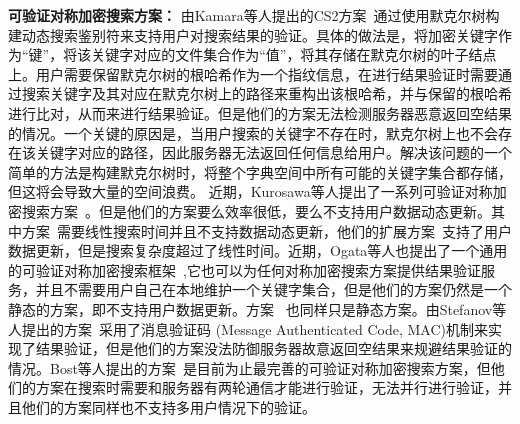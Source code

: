 



\noindent\textbf{可验证对称加密搜索方案：} 由Kamara等人提出的CS2方案~\cite{kamara2011cs2}通过使用默克尔树构建动态搜索鉴别符来支持用户对搜索结果的验证。具体的做法是，将加密关键字作为“键”，将该关键字对应的文件集合作为“值”，将其存储在默克尔树的叶子结点上。用户需要保留默克尔树的根哈希作为一个指纹信息，在进行结果验证时需要通过搜索关键字及其对应在默克尔树上的路径来重构出该根哈希，并与保留的根哈希进行比对，从而来进行结果验证。但是他们的方案无法检测服务器恶意返回空结果的情况。一个关键的原因是，当用户搜索的关键字不存在时，默克尔树上也不会存在该关键字对应的路径，因此服务器无法返回任何信息给用户。解决该问题的一个简单的方法是构建默克尔树时，将整个字典空间中所有可能的关键字集合都存储，但这将会导致大量的空间浪费。
近期，Kurosawa等人提出了一系列可验证对称加密搜索方案~\cite{kurosawa2012uc,kurosawa2013update,ogataefficient}。但是他们的方案要么效率很低，要么不支持用户数据动态更新。其中方案~\cite{kurosawa2012uc}需要线性搜索时间并且不支持数据动态更新，他们的扩展方案~\cite{kurosawa2013update}支持了用户数据更新，但是搜索复杂度超过了线性时间。近期，Ogata等人也提出了一个通用的可验证对称加密搜索框架~\cite{ogataefficient},它也可以为任何对称加密搜索方案提供结果验证服务，并且不需要用户自己在本地维护一个关键字集合，但是他们的方案仍然是一个静态的方案，即不支持用户数据更新。方案~\cite{chai2012verifiable} \cite{cheng2015verifiable}也同样只是静态方案。由Stefanov等人提出的方案~\cite{stefanov2014practical}采用了消息验证码 (Message Authenticated Code, MAC)机制来实现了结果验证，但是他们的方案没法防御服务器故意返回空结果来规避结果验证的情况。Bost等人提出的方案~\cite{bost2016verifiable}是目前为止最完善的可验证对称加密搜索方案，但他们的方案在搜索时需要和服务器有两轮通信才能进行验证，无法并行进行验证，并且他们的方案同样也不支持多用户情况下的验证。


